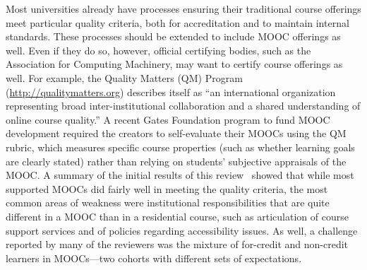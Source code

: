 Most universities already have processes ensuring their traditional
course offerings meet particular quality criteria, both for
accreditation and to maintain internal standards.
These processes should be extended to include MOOC offerings as well.
Even if they do so, however, official certifying bodies, such as the
Association for Computing Machinery, may want to certify course
offerings as well.
For example, the Quality Matters (QM) Program
(\url{http://qualitymatters.org}) describes itself as ``an
international organization representing broad inter-institutional
collaboration and a shared understanding of online course quality.''
A recent Gates Foundation program to fund MOOC development required
the creators to self-evaluate their MOOCs using the QM rubric, which
measures specific course properties (such as whether learning goals
are clearly stated) rather than relying on students' subjective
appraisals of the MOOC.
A summary of the initial results of this
review~\cite{gates-qm-review-summary-2013} showed that while most
supported MOOCs did fairly well in meeting the quality criteria, the
most common areas of weakness were institutional responsibilities that
are quite different in a MOOC than in a residential course, such as
articulation of course support services and of policies regarding
accessibility issues.  As well, a challenge reported by many of the
reviewers was the mixture of for-credit and non-credit learners in
MOOCs---two cohorts with different sets of expectations.

